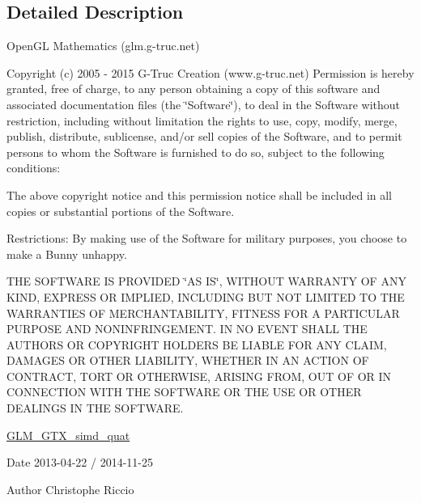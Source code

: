 \subsection{Detailed Description}
Open\+G\+L Mathematics (glm.\+g-\/truc.\+net)

Copyright (c) 2005 -\/ 2015 G-\/\+Truc Creation (www.\+g-\/truc.\+net) Permission is hereby granted, free of charge, to any person obtaining a copy of this software and associated documentation files (the \char`\"{}\+Software\char`\"{}), to deal in the Software without restriction, including without limitation the rights to use, copy, modify, merge, publish, distribute, sublicense, and/or sell copies of the Software, and to permit persons to whom the Software is furnished to do so, subject to the following conditions\+:

The above copyright notice and this permission notice shall be included in all copies or substantial portions of the Software.

Restrictions\+: By making use of the Software for military purposes, you choose to make a Bunny unhappy.

T\+H\+E S\+O\+F\+T\+W\+A\+R\+E I\+S P\+R\+O\+V\+I\+D\+E\+D \char`\"{}\+A\+S I\+S\char`\"{}, W\+I\+T\+H\+O\+U\+T W\+A\+R\+R\+A\+N\+T\+Y O\+F A\+N\+Y K\+I\+N\+D, E\+X\+P\+R\+E\+S\+S O\+R I\+M\+P\+L\+I\+E\+D, I\+N\+C\+L\+U\+D\+I\+N\+G B\+U\+T N\+O\+T L\+I\+M\+I\+T\+E\+D T\+O T\+H\+E W\+A\+R\+R\+A\+N\+T\+I\+E\+S O\+F M\+E\+R\+C\+H\+A\+N\+T\+A\+B\+I\+L\+I\+T\+Y, F\+I\+T\+N\+E\+S\+S F\+O\+R A P\+A\+R\+T\+I\+C\+U\+L\+A\+R P\+U\+R\+P\+O\+S\+E A\+N\+D N\+O\+N\+I\+N\+F\+R\+I\+N\+G\+E\+M\+E\+N\+T. I\+N N\+O E\+V\+E\+N\+T S\+H\+A\+L\+L T\+H\+E A\+U\+T\+H\+O\+R\+S O\+R C\+O\+P\+Y\+R\+I\+G\+H\+T H\+O\+L\+D\+E\+R\+S B\+E L\+I\+A\+B\+L\+E F\+O\+R A\+N\+Y C\+L\+A\+I\+M, D\+A\+M\+A\+G\+E\+S O\+R O\+T\+H\+E\+R L\+I\+A\+B\+I\+L\+I\+T\+Y, W\+H\+E\+T\+H\+E\+R I\+N A\+N A\+C\+T\+I\+O\+N O\+F C\+O\+N\+T\+R\+A\+C\+T, T\+O\+R\+T O\+R O\+T\+H\+E\+R\+W\+I\+S\+E, A\+R\+I\+S\+I\+N\+G F\+R\+O\+M, O\+U\+T O\+F O\+R I\+N C\+O\+N\+N\+E\+C\+T\+I\+O\+N W\+I\+T\+H T\+H\+E S\+O\+F\+T\+W\+A\+R\+E O\+R T\+H\+E U\+S\+E O\+R O\+T\+H\+E\+R D\+E\+A\+L\+I\+N\+G\+S I\+N T\+H\+E S\+O\+F\+T\+W\+A\+R\+E.

\hyperlink{group__gtx__simd__quat}{G\+L\+M\+\_\+\+G\+T\+X\+\_\+simd\+\_\+quat}

\begin{DoxyDate}{Date}
2013-\/04-\/22 / 2014-\/11-\/25 
\end{DoxyDate}
\begin{DoxyAuthor}{Author}
Christophe Riccio 
\end{DoxyAuthor}
